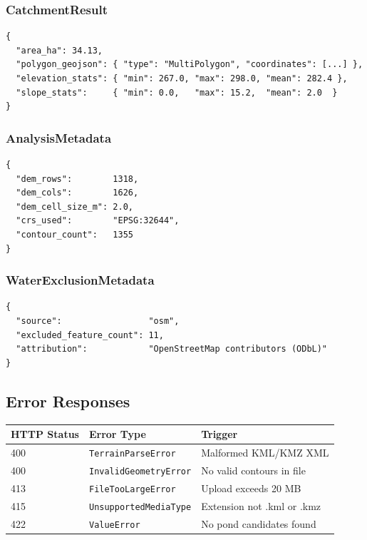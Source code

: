 \documentclass[12pt,a4paper]{article}
\begin{document}
\subsubsection{CatchmentResult}
\begin{lstlisting}[style=json]
{
  "area_ha": 34.13,
  "polygon_geojson": { "type": "MultiPolygon", "coordinates": [...] },
  "elevation_stats": { "min": 267.0, "max": 298.0, "mean": 282.4 },
  "slope_stats":     { "min": 0.0,   "max": 15.2,  "mean": 2.0  }
}
\end{lstlisting}

\subsubsection{AnalysisMetadata}
\begin{lstlisting}[style=json]
{
  "dem_rows":        1318,
  "dem_cols":        1626,
  "dem_cell_size_m": 2.0,
  "crs_used":        "EPSG:32644",
  "contour_count":   1355
}
\end{lstlisting}

\subsubsection{WaterExclusionMetadata}
\begin{lstlisting}[style=json]
{
  "source":                 "osm",
  "excluded_feature_count": 11,
  "attribution":            "OpenStreetMap contributors (ODbL)"
}
\end{lstlisting}

\subsection{Error Responses}

\begin{center}
\begin{tabular}{lll}
    \toprule
    \textbf{HTTP Status} & \textbf{Error Type}        & \textbf{Trigger} \\
    \midrule
    400 & \texttt{TerrainParseError}    & Malformed KML/KMZ XML \\
    400 & \texttt{InvalidGeometryError} & No valid contours in file \\
    413 & \texttt{FileTooLargeError}    & Upload exceeds 20 MB \\
    415 & \texttt{UnsupportedMediaType} & Extension not .kml or .kmz \\
    422 & \texttt{ValueError}           & No pond candidates found \\
    \bottomrule
\end{tabular}
\end{center}
\end{document}
